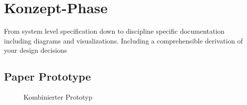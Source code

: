 \section{Konzept-Phase}
From system level specification down to discipline specific documentation including diagrams and visualizations. Including a comprehensible derivation of your design decisions

\subsection{Paper Prototype}

\begin{figure}[H]
  \caption{Kombinierter Prototyp}
  \label{fig:model_proto}
\end{figure}